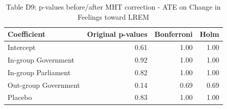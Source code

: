 \begin{table}[H]
\centering
\caption{Table D9: p-values before/after MHT correction - ATE on Change in Feelings toward LREM}
\centering
\begin{tabular}[t]{lrrr}
\toprule
Coefficient & Original p-values & Bonferroni & Holm\\
\midrule
Intercept & 0.61 & 1.00 & 1.00\\
In-group Government & 0.92 & 1.00 & 1.00\\
In-group Parliament & 0.82 & 1.00 & 1.00\\
Out-group Government & 0.14 & 0.69 & 0.69\\
Placebo & 0.83 & 1.00 & 1.00\\
\bottomrule
\end{tabular}
\end{table}
